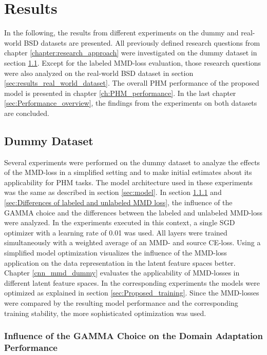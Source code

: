 \chapter{Results}\label{sec:results}

In the following, the results from different experiments on the dummy and real-world BSD datasets are presented. All previously defined research questions from chapter \ref{chapter:research_approach} were investigated on the dummy dataset in section \ref{sec:results_dummy_dataset}. Except for the labeled MMD-loss evaluation, those research questions were also analyzed on the real-world BSD dataset in section \ref{sec:results_real_world_dataset}. The overall PHM performance of the proposed model is presented in chapter \ref{ch:PHM_performance}. In the last chapter \ref{sec:Performance_overview}, the findings from the experiments on both datasets are concluded.




\section{Dummy Dataset}\label{sec:results_dummy_dataset}
Several experiments were performed on the dummy dataset to analyze the effects of the MMD-loss in a simplified setting and to make initial estimates about its applicability for PHM tasks. The model architecture used in these experiments was the same as described in section \ref{sec:model}. In section \ref{sec:Balancing Cross-Entropy and MMD loss} and \ref{sec:Differences of labeled and unlabeled MMD loss}, the influence of the GAMMA choice and the differences between the labeled and unlabeled MMD-loss were analyzed. In the experiments executed in this context, a single SGD optimizer with a learning rate of 0.01 was used. All layers were trained simultaneously with a weighted average of an MMD- and source CE-loss. Using a simplified model optimization visualizes the influence of the MMD-loss application on the data representation in the latent feature spaces better. Chapter \ref{cnn_mmd_dummy} evaluates the applicability of MMD-losses in different latent feature spaces. In the corresponding experiments the models were optimized as explained in section \ref{sec:Proposed_training}. Since the MMD-losses were compared by the resulting model performance and the corresponding training stability, the more sophisticated optimization was used.

\subsection{Influence of the GAMMA Choice on the Domain Adaptation Performance} \label{sec:Balancing Cross-Entropy and MMD loss}

